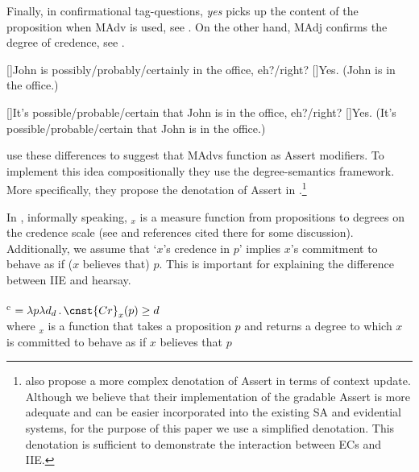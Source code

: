 \documentclass[output=paper,
]{langscibook}
\begin{document}
 	\ea \label{madvif} 
        \z\z
 
\noindent Finally, in confirmational tag-questions, \textit{yes} picks up the content of the proposition when MAdv is used, see . On the other hand, MAdj confirms the degree of credence, see .

	\ea \ea\label{madvyesa}
	\begin{xlist}
	[]{John is possibly/probably/certainly in the office, eh?/right?}
	[]{Yes. (John is in the office.)}
		\end{xlist}
	\ex\label{madvyesb}
	\begin{xlist}
	[]{It's possible/probable/certain that John is in the office, eh?/right?}
    []{Yes. (It's possible/probable/certain that John is in the office.)}
	\end{xlist}
        \z \z

\noindent \citet{grewol17} use these differences to suggest that MAdvs function as Assert modifiers. To implement this idea compositionally they use the degree-semantics framework. More specifically, they propose the denotation of Assert in .\footnote{\citet{grewol17} also propose a more complex denotation of Assert in terms of context update.
Although we believe that their implementation of the gradable Assert is more adequate and can be easier incorporated into the existing SA and evidential systems, for the purpose of this paper we use a simplified denotation. This denotation is sufficient  to demonstrate the interaction between ECs and IIE.} 

In , informally speaking, $_{x}$ is a measure function from propositions to degrees on the credence scale (see \citealt{herrub14} and references cited there for some discussion). Additionally, we assume that `$x$'s credence in $p$' implies $x$'s commitment to behave as if ($x$ believes that) $p$. This is important for explaining the difference between IIE and hearsay.

	\ea {}\textsuperscript{c} $= \lambda p\lambda d_d\,.\, \cnst{Cr}_{x}(p) \geq d $ \\
    where $_{x}$ is a function that takes a proposition $p$ and returns a degree to which $x$ is committed to behave as if $x$ believes that $p$ \label{assert} 
    \z
   
\end{document}
